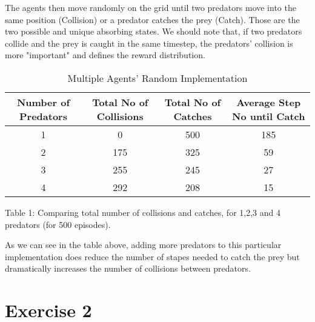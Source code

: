 \documentclass[a4paper,11pt]{article}
\begin{document}
The agents then move randomly on the grid until two predators move into the same position (Collision) or a predator catches the prey (Catch). Those are the two possible and unique absorbing states. We should note that, if two predators collide and the prey is caught in the same timestep, the predators' collision is more "important" and defines the reward distribution.



\begin{table}[h]
\begin{center}
\caption{Multiple Agents' Random Implementation}
\begin{tabular}{c c c c} 
\hline\hline               
Number of Predators & Total No of Collisions & Total No of Catches & Average Step No until Catch \\  
\hline
1 & 0 & 500 & 185\\ 
2 & 175 & 325  & 59\\
3 & 255 & 245   & 27\\
4 & 292 & 208 & 15 \\ 
\end{tabular}
\label{table:multirandom} 
\end{center} 
\end{table} 
\begin{center}
Table 1: Comparing total number of collisions and catches, for 1,2,3 and 4 predators (for 500 episodes).
\end{center}

As we can see in the table above, adding more predators to this particular implementation does reduce the number of stapes needed to catch the prey but dramatically increases the number of collisions between predators.
 

\section*{Exercise 2}
\end{document}
